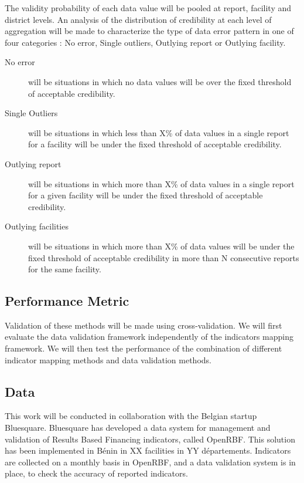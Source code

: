 The validity probability of each data value will be pooled at report, facility and district levels. An analysis of the distribution of credibility at each level of aggregation will be made to characterize the type of data error pattern in one of four categories : No error, Single outliers, Outlying report or Outlying facility.
\begin{description}
	\item[No error] will be situations in which no data values will be over the fixed threshold of acceptable credibility.
	\item[Single Outliers] will be situations in which less than X\% of data values in a single report for a facility will be under the fixed threshold of acceptable credibility.
	\item[Outlying report] will be situations in which more than X\% of data values in a single report for a given facility will be under the fixed threshold of acceptable credibility.
	\item[Outlying facilities] will be situations in which more than X\% of data values will be under the fixed threshold of acceptable credibility in more than N consecutive reports for the same facility.
\end{description}

\subsection{Performance Metric}

Validation of these methods will be made using cross-validation. We will first evaluate the data validation framework independently of the indicators mapping framework. We will then test the performance of the combination of different indicator mapping methods and data validation methods.

\subsection{Data}
\label{paper2_data}

This work will be conducted in collaboration with the Belgian startup Bluesquare. Bluesquare has developed a data system for management and validation of Results Based Financing indicators, called OpenRBF. This solution has been implemented in Bénin in XX facilities in YY départements. Indicators are collected on a monthly basis in OpenRBF, and a data validation system is in place, to check the accuracy of reported indicators.

